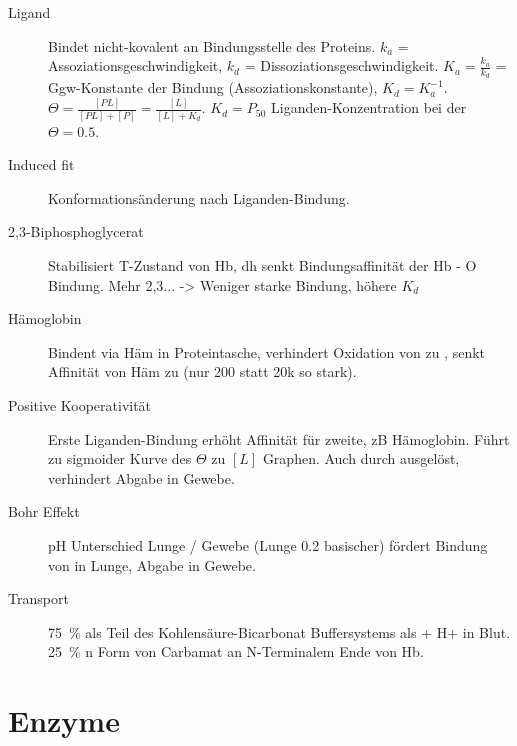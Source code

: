 \documentclass[a4paper,twocolumn,english,fontsize=7,DIV=16]{scrartcl}
\begin{document}
\begin{description}
	\item[Ligand] Bindet nicht-kovalent an Bindungsstelle des Proteins.
		$k_a$ = Assoziationsgeschwindigkeit, $k_d$ =
		Dissoziationsgeschwindigkeit.  $K_a = \frac{k_a}{k_d}$ =
		Ggw-Konstante der Bindung (Assoziationskonstante), $K_d =
		K_a^{-1}$. $\Theta = \frac{[PL]}{[PL] + [P]} = \frac{[L]}{[L] +
		K_d}$. $K_d = P_{50}$ Liganden-Konzentration bei der $\Theta =
		0.5$.
	\item[Induced fit] Konformationsänderung nach Liganden-Bindung.
	\item[2,3-Biphosphoglycerat] Stabilisiert T-Zustand von Hb, dh senkt
		Bindungsaffinität der Hb - O Bindung. Mehr 2,3... -> Weniger
		starke Bindung, höhere $K_d$
	\item[Hämoglobin] Bindent  via Häm in Proteintasche, verhindert
		Oxidation von  zu , senkt Affinität von Häm
		zu  (nur 200 statt 20k so stark).
	\item[Positive Kooperativität] Erste Liganden-Bindung erhöht Affinität
		für zweite, zB Hämoglobin. Führt zu sigmoider Kurve des
		$\Theta$ zu $[L]$ Graphen. Auch durch  ausgelöst,
		verhindert Abgabe in Gewebe.
	\item[Bohr Effekt] pH Unterschied Lunge / Gewebe (Lunge 0.2 basischer)
		fördert Bindung von  in Lunge, Abgabe in Gewebe.
	\item[ Transport] \SI{75}{\percent} als Teil des
		Kohlensäure-Bicarbonat Buffersystems als  + H+ in
		Blut. \SI{25}{\percent}  n Form von Carbamat an N-Terminalem
		Ende von Hb.
\end{description}

\section{Enzyme}
\end{document}
